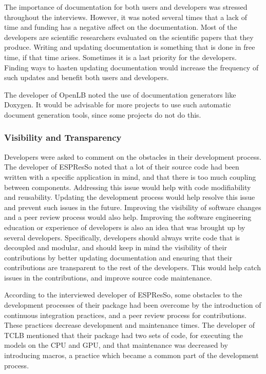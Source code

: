 \documentclass[12pt, notitlepage]{article}
\begin{document}
The importance of documentation for both users and developers was stressed throughout the interviews. However, it was noted several times that a lack of time and funding has a negative affect on the documentation. Most of the developers are scientific researchers evaluated on the scientific papers that they produce. Writing and updating documentation is something that is done in free time, if that time arises. Sometimes it is a last priority for the developers. Finding ways to hasten updating documentation would increase the frequency of such updates and benefit both users and developers. 

The developer of OpenLB noted the use of documentation generators like Doxygen. It would be advisable for more projects to use such automatic document generation tools, since some projects do not do this.  

\subsubsection{Visibility and Transparency}

Developers were asked to comment on the obstacles in their development process. The developer of ESPResSo noted that a lot of their source code had been written with a specific application in mind, and that there is too much coupling between components. Addressing this issue would help with code modifiability and reusability. Updating the development process would help resolve this issue and prevent such issues in the future. Improving the visibility of software changes and a peer review process would also help. Improving the software engineering education or experience of developers is also an idea that was brought up by several developers. Specifically, developers should always write code that is decoupled and modular, and should keep in mind the visibility of their contributions by better updating documentation and ensuring that their contributions are transparent to the rest of the developers. This would help catch issues in the contributions, and improve source code maintenance.   

According to the interviewed developer of ESPResSo, some obstacles to the development processes of their package had been overcome by the introduction of continuous integration practices, and a peer review process for contributions. These practices decrease development and maintenance times. The developer of TCLB mentioned that their package had two sets of code, for executing the models on the CPU and GPU, and that maintenance was decreased by introducing macros, a practice which became a common part of the development process. 
\end{document}
